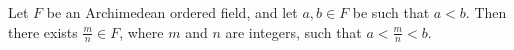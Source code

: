 Let $F$ be an Archimedean ordered field, and let $a, b \in F$ be such that $a < b$. Then there exists $\frac{m}{n} \in F$, where $m$ and $n$ are integers, such that $a < \frac{m}{n} < b.$